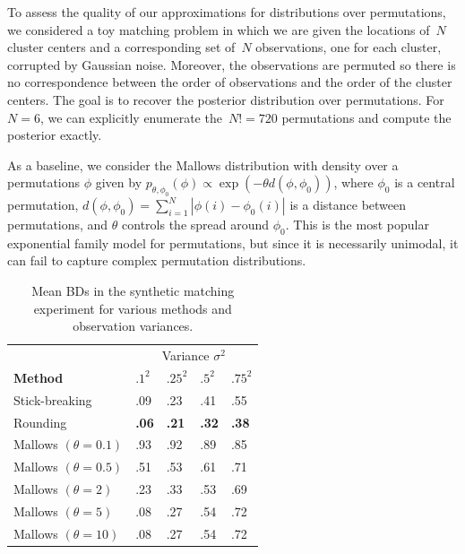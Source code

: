\documentclass[twoside]{article}
\begin{document}
To assess the quality of our approximations for distributions over
permutations, we considered a toy matching problem in which we are
given the locations of~$N$ cluster centers and a corresponding set
of~$N$ observations, one for each cluster, corrupted by Gaussian
noise.  Moreover, the observations are permuted so there is no
correspondence between the order of observations and the order of the
cluster centers.  The goal is to recover the posterior distribution
over permutations.  For~$N=6$, we can explicitly enumerate
the~$N!=720$ permutations and compute the posterior exactly.
 
As a baseline, we consider the Mallows distribution \cite{Mallows1957}
with density over a permutations $\phi$ given by
$p_{\theta, \phi_0}(\phi)\propto \exp(-\theta d(\phi,\phi_0))$, where
$\phi_0$ is a central permutation,
${d(\phi,\phi_0)=\sum_{i=1}^N |\phi(i)-\phi_0(i)|}$ is a distance
between permutations, and $\theta$ controls the spread around
$\phi_0$. This is the most popular exponential family model for
permutations, but since it is necessarily unimodal, it can fail to
capture complex permutation distributions.

 \begin{table}[h]
  \caption{Mean BDs in the synthetic matching experiment for various methods and observation variances.}
  \label{table:BDs}
  \centering
  \begin{tabular}{lllll}
    & \multicolumn{4}{c}{Variance $\sigma^2$} \\
    \cmidrule(lr){3-4} 
    \textbf{Method} & $.1^2$ & $.25^2$ & $.5^2$ & $.75^2$ \\
    \hline
    Stick-breaking & .09 & .23 & .41 & .55 \\
    Rounding & \textbf{.06} & \textbf{.21}  & \textbf{.32}  & \textbf{.38} \\
    Mallows $(\theta=0.1)$ & .93 & .92 & .89  & .85 \\
    Mallows $(\theta=0.5)$ & .51 & .53  & .61 & .71 \\
    Mallows $(\theta=2)$ & .23 & .33 & .53  & .69 \\
    Mallows $(\theta=5)$ & .08 & .27 & .54 & .72 \\
    Mallows $(\theta=10)$ & .08 & .27 & .54  & .72 \\
    \bottomrule
  \end{tabular}
\end{table}
\end{document}
